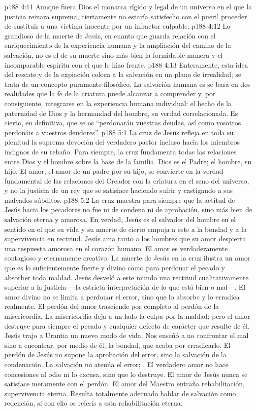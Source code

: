 \vs p188 4:11 Aunque fuera Dios el monarca rígido y legal de un universo en el que la justicia reinara suprema, ciertamente no estaría satisfecho con el pueril proceder de sustituir a una víctima inocente por un infractor culpable.
\vs p188 4:12 Lo grandioso de la muerte de Jesús, en cuanto que guarda relación con el enriquecimiento de la experiencia humana y la ampliación del camino de la salvación, no es el  de su muerte sino más bien la formidable manera y el incomparable espíritu con el que le hizo frente.
\vs p188 4:13 Enteramente, esta idea del rescate y de la expiación coloca a la salvación en un plano de irrealidad; se trata de un concepto puramente filosófico. La salvación humana es  se basa en dos realidades que la fe de la criatura puede alcanzar a comprender y, por consiguiente, integrarse en la experiencia humana individual: el hecho de la paternidad de Dios y la hermandad del hombre, su verdad correlacionada. Es cierto, en definitiva, que se os “perdonarán vuestras deudas, así como vosotros perdonáis a vuestros deudores”.
\vs p188 5:1 La cruz de Jesús refleja en toda su plenitud la suprema devoción del verdadero pastor incluso hacia los miembros indignos de su rebaño. Para siempre, la cruz fundamenta todas las relaciones entre Dios y el hombre sobre la base de la familia. Dios es el Padre; el hombre, su hijo. El amor, el amor de un padre por su hijo, se convierte en la verdad fundamental de las relaciones del Creador con la criatura en el seno del universo, y no la justicia de un rey que se satisface haciendo sufrir y castigando a sus malvados súbditos.
\vs p188 5:2 La cruz muestra para siempre que la actitud de Jesús hacia los pecadores no fue ni de condena ni de aprobación, sino más bien de salvación eterna y amorosa. En verdad, Jesús es el salvador del hombre en el sentido en el que su vida y su muerte de cierto empuja a este a la bondad y a la supervivencia en rectitud. Jesús ama tanto a los hombres que su amor despierta una respuesta amorosa en el corazón humano. El amor es verdaderamente contagioso y eternamente creativo. La muerte de Jesús en la cruz ilustra un amor que es lo suficientemente fuerte y divino como para perdonar el pecado y absorber toda maldad. Jesús desveló a este mundo una rectitud cualitativamente superior a la justicia ---la estricta interpretación de lo que está bien o mal---. El amor divino no se limita a perdonar el error, sino que lo absorbe y lo erradica realmente. El perdón del amor trasciende por completo al perdón de la misericordia. La misericordia deja a un lado la culpa por la maldad; pero el amor destruye para siempre el pecado y cualquier defecto de carácter que resulte de él. Jesús trajo a Urantia un nuevo modo de vida. Nos enseñó a no confrontar el mal sino a encontrar, por medio de él, la bondad, que acaba por erradicarlo. El perdón de Jesús no supone la aprobación del error, sino la salvación de la condenación. La salvación no atenúa el error; . El verdadero amor no hace concesiones al odio ni lo excusa, sino que lo destruye. El amor de Jesús nunca se satisface meramente con el perdón. El amor del Maestro entraña rehabilitación, supervivencia eterna. Resulta totalmente adecuado hablar de salvación como redención, si con ello os referís a esta rehabilitación eterna.

